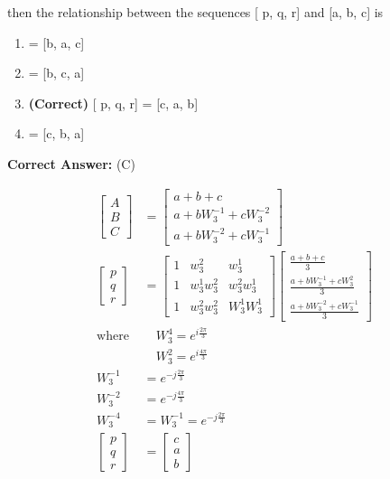 \documentclass[11pt,a4paper]{article}
\begin{document}
 then the relationship between the sequences [ p, q, r] and [a, b, c] is


\begin{enumerate}[label=(\Alph*)]
    \item [ p, q, r] = [b, a, c]
    \item [ p, q, r] = [b, c, a]
    \item \textbf{(Correct)} [ p, q, r] = [c, a, b]
    \item [ p, q, r] = [c, b, a]
\end{enumerate}

\noindent \textbf{Correct Answer:} (C)

\begin{tcolorbox}[solbox, title=Detailed Solution -- Question 109]
\[
\begin{aligned} \left[\begin{array}{l}A \\ B \\ C\end{array}\right]&=\left[\begin{array}{l}a+b+c \\ a+b W_{3}^{-1}+c W_{3}^{-2} \\ a+b W_{3}^{-2}+c W_{3}^{-1}\end{array}\right] \\ \left[\begin{array}{l}p \\ q \\ r\end{array}\right]&=\left[\begin{array}{ccc}1 & w_{3}^{2} & w_{3}^{1} \\ 1 & w_{3}^{1} w_{3}^{2} & w_{3}^{2} w_{3}^{1} \\ 1 & w_{3}^{2} w_{3}^{2} & W_{3}^{1} W_{3}^{1}\end{array}\right]\left[\begin{array}{c}\frac{a+b+c}{3} \\ \frac{a+b W_{3}^{-1}+c W_{3}^{2}}{3} \\ \frac{a+b W_{3}^{-2}+c W_{3}^{-1}}{3}\end{array}\right] \\ \text{where }&\quad W_{3}^{4}=e^{i \frac{2 \pi}{3}} \\ &\quad W_{3}^{2}=e^{i \frac{4 \pi}{3}}\\ W_{3}^{-1}&=e^{-j \frac{2 \pi}{3}} \\ W_{3}^{-2}&=e^{-j \frac{4 \pi}{3}} \\ W_{3}^{-4}&=W_{3}^{-1}=e^{-j \frac{2 \pi}{3}} \\ \left[\begin{array}{l}p \\q \\r\end{array}\right]&=\left[\begin{array}{l} c \\a \\b\end{array}\right] \end{aligned}
\]
\end{tcolorbox}
\end{document}
